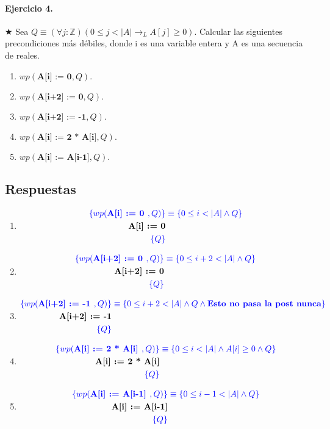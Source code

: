 \documentclass{article}
\begin{document}
\paragraph{Ejercicio 4.} $\bigstar$ Sea $Q \equiv (\forall j :\mathbb{Z})(0 \leq j < |A| \rightarrow_L
 A[j] \geq 0)$. Calcular las 
siguientes precondiciones más débiles, donde i es
una variable entera y A es una secuencia de reales.

\begin{enumerate}[label=\alph*)]
\item $wp(\textbf{A[i] := 0}, Q).$
\item $wp(\textbf{A[i+2] := 0}, Q).$
\item $wp(\textbf{A[i+2] := -1}, Q).$
\item $wp(\textbf{A[i] := 2 * A[i]}, Q).$
\item $wp(\textbf{A[i] := A[i-1]}, Q).$
\end{enumerate}

\subsection*{Respuestas}

\begin{enumerate}[label=\alph*)]
	\item
		\begin{align*}
		\color{blue}\{wp(\textbf{A[i] := 0 },Q)\} &\color{blue}
			\equiv \{0\leq i<|A|\wedge Q\}\\
		\textbf{A[i] := 0}\\
		\color{blue}\{Q\}
		\end{align*}
	\item
		\begin{align*}
		\color{blue}\{wp(\textbf{A[i+2] := 0 },Q)\} &\color{blue}
			\equiv \{0\leq i+2<|A|\wedge Q\}\\
		\textbf{A[i+2] := 0}\\
		\color{blue}\{Q\}
		\end{align*}
	\item
		\begin{align*}
		\color{blue}\{wp(\textbf{A[i+2] := -1 },Q)\} &\color{blue}
			\equiv \{0\leq i+2<|A|\wedge Q\wedge \textbf{Esto no pasa la post nunca}\}\\
		\textbf{A[i+2] := -1}\\
		\color{blue}\{Q\}
		\end{align*}
	\item
		\begin{align*}
		\color{blue}\{wp(\textbf{A[i] := 2 * A[i] },Q)\} &\color{blue}
			\equiv \{0\leq i<|A|\wedge A[i]\geq 0 \wedge Q\}\\
		\textbf{A[i] := 2 * A[i]}\\
		\color{blue}\{Q\}
		\end{align*}
	\item
		\begin{align*}
		\color{blue}\{wp(\textbf{A[i] := A[i-1] },Q)\} &\color{blue}
			\equiv \{0\leq i-1<|A|\wedge Q\}\\
		\textbf{A[i] := A[i-1]}\\
		\color{blue}\{Q\}
		\end{align*}
\end{enumerate}
\end{document}
